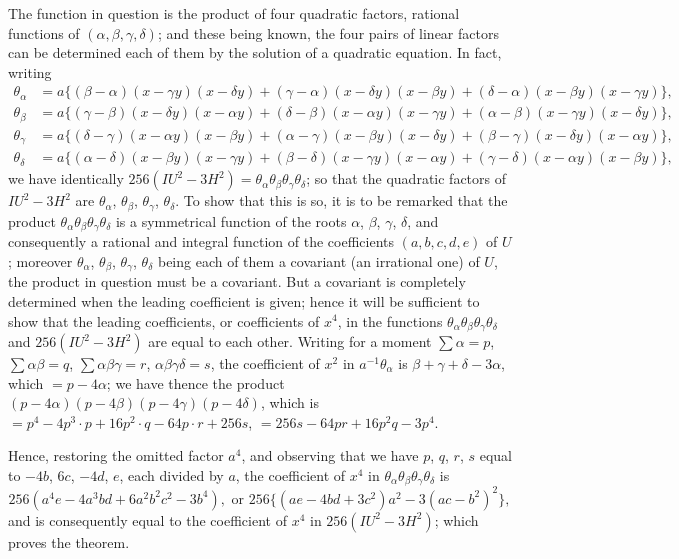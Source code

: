 \documentclass[12pt,a4paper]{article}
\theoremstyle{plain}
\begin{document}
The function in question is the product of four quadratic factors, rational functions of $(\alpha,\beta,\gamma,\delta)$; and these being known, the four pairs of linear factors can be determined each of them by the solution of a quadratic equation. In fact, writing
\begin{align*}
\theta_\alpha &= a\{(\beta-\alpha)(x-\gamma y)(x-\delta y) + (\gamma-\alpha)(x-\delta y)(x-\beta y) + (\delta-\alpha)(x-\beta y)(x-\gamma y)\},\\
\theta_\beta &= a\{(\gamma-\beta)(x-\delta y)(x-\alpha y) + (\delta-\beta)(x-\alpha y)(x-\gamma y) + (\alpha-\beta)(x-\gamma y)(x-\delta y)\},\\
\theta_\gamma &= a\{(\delta-\gamma)(x-\alpha y)(x-\beta y) + (\alpha-\gamma)(x-\beta y)(x-\delta y) + (\beta-\gamma)(x-\delta y)(x-\alpha y)\},\\
\theta_\delta &= a\{(\alpha-\delta)(x-\beta y)(x-\gamma y) + (\beta-\delta)(x-\gamma y)(x-\alpha y) + (\gamma-\delta)(x-\alpha y)(x-\beta y)\},
\end{align*}
we have identically $256(IU^2-3H^2) = \theta_\alpha\theta_\beta\theta_\gamma\theta_\delta$; so that the quadratic factors of $IU^2-3H^2$ are $\theta_\alpha$, $\theta_\beta$, $\theta_\gamma$, $\theta_\delta$. To show that this is so, it is to be remarked that the product $\theta_\alpha\theta_\beta\theta_\gamma\theta_\delta$ is a symmetrical function of the roots $\alpha$, $\beta$, $\gamma$, $\delta$, and consequently a rational and integral function of the coefficients $(a,b,c,d,e)$ of $U$; moreover $\theta_\alpha$, $\theta_\beta$, $\theta_\gamma$, $\theta_\delta$ being each of them a covariant (an irrational one) of $U$, the product in question must be a covariant. But a covariant is completely determined when the leading coefficient is given; hence it will be sufficient to show that the leading coefficients, or coefficients of $x^4$, in the functions $\theta_\alpha\theta_\beta\theta_\gamma\theta_\delta$ and $256(IU^2-3H^2)$ are equal to each other. Writing for a moment $\sum\alpha=p$, $\sum\alpha\beta=q$, $\sum\alpha\beta\gamma=r$, $\alpha\beta\gamma\delta=s$, the coefficient of $x^2$ in $a^{-1}\theta_\alpha$ is $\beta+\gamma+\delta-3\alpha$, which $=p-4\alpha$; we have thence the product $(p-4\alpha)(p-4\beta)(p-4\gamma)(p-4\delta)$, which is $=p^4-4p^3\cdot p+16p^2\cdot q-64p\cdot r+256s$, $=256s-64pr+16p^2q-3p^4$.

Hence, restoring the omitted factor $a^4$, and observing that we have $p$, $q$, $r$, $s$ equal to $-4b$, $6c$, $-4d$, $e$, each divided by $a$, the coefficient of $x^4$ in $\theta_\alpha\theta_\beta\theta_\gamma\theta_\delta$ is
\[256(a^4e-4a^3bd+6a^2b^2c^2-3b^4),\text{ or }256\{(ae-4bd+3c^2)a^2-3(ac-b^2)^2\},\]
and is consequently equal to the coefficient of $x^4$ in $256(IU^2-3H^2)$; which proves the theorem.
\end{document}
